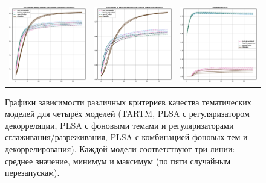 \begin{figure}
\begin{tabular}{ccc}
    \includegraphics[width=55mm]{images/CH4_vs_regularized_diversity_jensenshannon_False.eps} &   \includegraphics[width=55mm]{images/CH4_vs_regularized_diversity_jensenshannon_True.eps} & \includegraphics[width=55mm]{images/CH4_vs_regularized_SparsityThetaScore.eps} \\

\end{tabular}
    \caption{Графики зависимости различных критериев качества тематических моделей для четырёх моделей (TARTM, PLSA с регуляризатором декорреляции, PLSA с фоновыми темами и регуляризаторами сглаживания/разреживания, PLSA с комбинацией фоновых тем и декоррелирования). Каждой модели соответствуют три линии: среднее значение, минимум и максимум (по пяти случайным перезапускам).}
\label{fig:ch4_vs_reg}
\end{figure}


